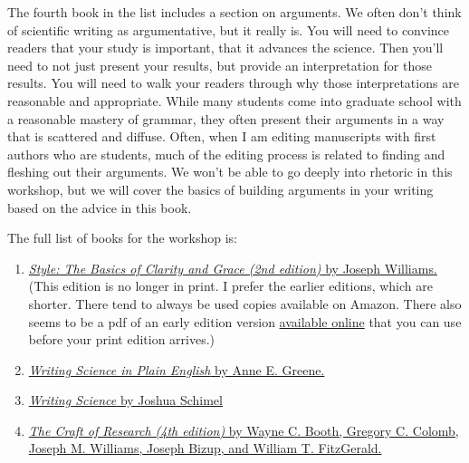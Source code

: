 \documentclass[]{tufte-book}
\providecommand{\tightlist}{%
  \setlength{\itemsep}{0pt}\setlength{\parskip}{0pt}}
\begin{document}
The fourth book in the list includes a section on arguments. We often don't think of
scientific writing as argumentative, but it really is. You will need to convince
readers that your study is important, that it advances the science. Then you'll
need to not just present your results, but provide an interpretation for those
results. You will need to walk your readers through why those interpretations
are reasonable and appropriate. While many students come into graduate school
with a reasonable mastery of grammar, they often present their arguments in a
way that is scattered and diffuse. Often, when I am editing manuscripts with
first authors who are students, much of the editing process is related to
finding and fleshing out their arguments. We won't be able to go deeply into
rhetoric in this workshop, but we will cover the basics of building arguments
in your writing based on the advice in this book.

The full list of books for the workshop is:

\begin{enumerate}
\def\labelenumi{\arabic{enumi}.}
\tightlist
\item
  \href{https://www.amazon.com/Style-Basics-Clarity-Grace-2nd/dp/0321330854/ref=sr_1_20?dchild=1\&keywords=joseph+williams+style\&qid=1594599265\&s=books\&sr=1-20}{\emph{Style: The Basics of Clarity and Grace (2nd edition)} by Joseph
  Williams.}
  (This edition is no longer in print. I prefer the earlier editions, which are
  shorter. There tend to always be used copies available on Amazon. There also
  seems to be a pdf of an early edition version \href{https://sites.duke.edu/niou/files/2014/07/WilliamsJosephM1990StyleTowardClarityandGrace.pdf}{available
  online}
  that you can use before your print edition arrives.)
\item
  \href{https://www.amazon.com/Writing-Science-English-Chicago-Publishing/dp/022602637X/ref=sr_1_2?crid=3R5FVEBHLEE6M\&dchild=1\&keywords=writing+science+in+plain+english\&qid=1594599082\&sprefix=writing+science+in+p\%2Caps\%2C185\&sr=8-2}{\emph{Writing Science in Plain English} by Anne E.
  Greene.}
\item
  \href{https://www.amazon.com/Writing-Science-Papers-Proposals-Funded/dp/0199760241/ref=pd_sbs_14_2/140-7397953-6612456?_encoding=UTF8\&pd_rd_i=0199760241\&pd_rd_r=a18d3605-570b-4f9c-a9b7-560aab4c2f19\&pd_rd_w=reAtV\&pd_rd_wg=ldykT\&pf_rd_p=bdc67ba8-ab69-42ee-b8d8-8f5336b36a83\&pf_rd_r=6JENX0H17SA0SEH0B3SH\&psc=1\&refRID=6JENX0H17SA0SEH0B3SH}{\emph{Writing Science} by Joshua
  Schimel}
\item
  \href{https://www.amazon.com/Research-Chicago-Writing-Editing-Publishing/dp/022623973X/ref=sr_1_2?dchild=1\&keywords=craft+of+research\&qid=1594599147\&s=books\&sr=1-2}{\emph{The Craft of Research (4th edition)} by Wayne C. Booth, Gregory C.
  Colomb, Joseph M. Williams, Joseph Bizup, and William T.
  FitzGerald.}
\end{enumerate}
\end{document}
